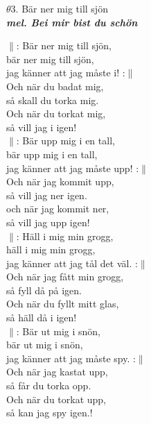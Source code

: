 \documentclass[a6paper,10pt]{article}
\newcommand{\mel}[1]{\small\textbf{\textit{mel. #1 \\}}}
\begin{document}
\setlength{\oddsidemargin}{-0.47in}
\begin{center}
\Large $\theta3$. Bär ner mig till sjön \\ 
\mel{Bei mir bist du schön}
\end{center}
$\|$: Bär ner mig till sjön, \\
bär ner mig till sjön, \\
jag känner att jag måste i! :$\|$ \\
Och när du badat mig, \\
så skall du torka mig. \\
Och när du torkat mig, \\
så vill jag i igen! 
\vspace{5pt}\\
$\|$: Bär upp mig i en tall,\\
bär upp mig i en tall,\\
jag känner att jag måste upp! :$\|$ \\
Och när jag kommit upp,\\
så vill jag ner igen. \\
och när jag kommit ner,\\
så vill jag upp igen! 
\vspace{5pt}\\
$\|$: Häll i mig min grogg,\\
häll i mig min grogg,\\
jag känner att jag tål det väl. :$\|$\\
Och när jag fått min grogg, \\
så fyll då på igen. \\
Och när du fyllt mitt glas, \\
så häll då i igen! 
\vspace{5pt}\\
$\|$: Bär ut mig i snön, \\
bär ut mig i snön, \\
jag känner att jag måste spy. :$\|$ \\
Och när jag kastat upp, \\
så får du torka opp. \\
Och när du torkat upp, \\
så kan jag spy igen.!
\end{document}
